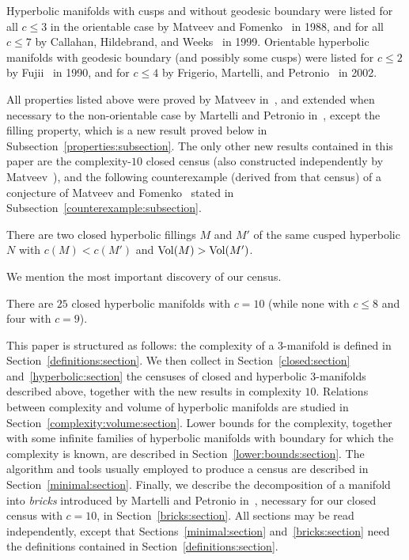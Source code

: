 \documentclass[10pt]{article}      %
\newcommand{\Vol}{{\rm Vol}}
\begin{document}
Hyperbolic manifolds with cusps and without geodesic boundary were listed for 
all $c\leqslant 3$ in the orientable case by Matveev and Fomenko~\cite{MaFo} in 1988, and for 
all $c\leqslant 7$ by Callahan, Hildebrand, and Weeks~\cite{CaHiWe} in 1999. Orientable hyperbolic
manifolds with geodesic boundary (and possibly some cusps) were listed for
$c\leqslant 2$ by Fujii~\cite{Fuj} in 1990, and for
$c\leqslant 4$ by Frigerio, Martelli, and Petronio~\cite{FriMaPe2} in 2002.

All properties listed above were proved by Matveev in~\cite{Mat90}, and extended
when necessary to the non-orientable case by Martelli and Petronio 
in~\cite{MaPe:nonori}, except the filling property, which is a new result proved below
in Subsection~\ref{properties:subsection}.
The only other new results contained in this paper are the complexity-$10$ closed census
(also constructed independently by Matveev~\cite{Mat:priv}),
and the following counterexample (derived from that census) of a conjecture
of Matveev and Fomenko~\cite{MaFo} stated in Subsection~\ref{counterexample:subsection}.
\begin{proposition}
There are two closed hyperbolic fillings $M$ and $M'$ of the same cusped hyperbolic $N$
with $c(M)<c(M')$ and $\Vol(M)>\Vol(M')$.
\end{proposition}
We mention the most important discovery of our census.
\begin{proposition}
There are $25$ closed hyperbolic manifolds with $c=10$ (while none with $c\leqslant 8$
and four with $c=9$).
\end{proposition}

This paper is structured as follows: the complexity of a $3$-manifold is defined in 
Section~\ref{definitions:section}. We then collect
in Section~\ref{closed:section} and~\ref{hyperbolic:section} the censuses of
closed and hyperbolic 3-manifolds described above, together with the new results in
complexity $10$. Relations between
complexity and volume of hyperbolic manifolds are studied in 
Section~\ref{complexity:volume:section}.
Lower bounds for the complexity, together with some infinite families of 
hyperbolic manifolds with boundary for
which the complexity is known, 
are described in Section~\ref{lower:bounds:section}. 
The algorithm and tools usually employed to produce a census are described in 
Section~\ref{minimal:section}.
Finally, we describe the decomposition of a manifold into \emph{bricks} 
introduced by Martelli and Petronio in~\cite{MaPe, MaPe:nonori}, necessary for our closed census
with $c=10$, in Section~\ref{bricks:section}. All sections may be read
independently, except that Sections~\ref{minimal:section} and~\ref{bricks:section}
need the definitions contained in Section~\ref{definitions:section}.
\end{document}
